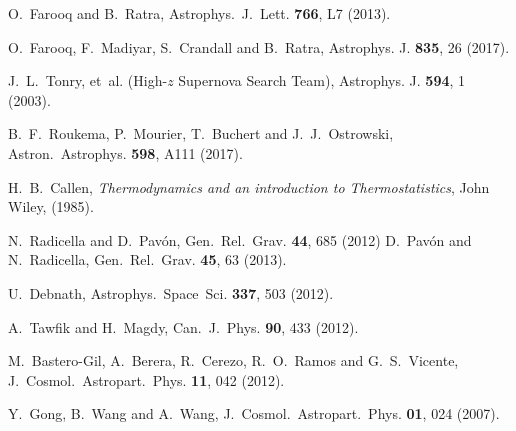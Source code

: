 \documentclass[twocolumn,showpacs,nofootinbib,floats,amsmath,amssymb]{revtex4}
\begin{document}
\begin{thebibliography}{99}
O.~Farooq and B.~Ratra, Astrophys.\ J.\ Lett. {\bf 766}, L7 (2013).

O.~Farooq, F.~Madiyar, S.~Crandall and B.~Ratra, Astrophys. J. {\bf 835}, 26 (2017).

J.~L.~Tonry, et~al. (High-$z$ Supernova Search Team), Astrophys. J. {\bf 594}, 1 (2003). 

B.~F.~Roukema, P.~Mourier, T.~Buchert and J.~J.~Ostrowski, Astron.\ Astrophys. {\bf 598}, A111 (2017).

H.~B.~Callen, {\it Thermodynamics and an introduction to Thermostatistics}, John Wiley, (1985).

N.~Radicella and D.~Pav\'on, Gen.\ Rel.\ Grav. {\bf 44}, 685 (2012)\; D.~Pav\'on and N.~Radicella, Gen.\ Rel.\ Grav. {\bf 45}, 63 (2013).
 
U.~Debnath, Astrophys.\ Space\ Sci. {\bf 337}, 503 (2012).   

A.~Tawfik and H.~Magdy, Can.\ J.\ Phys. {\bf 90}, 433 (2012). 

M.~Bastero-Gil, A.~Berera, R.~Cerezo, R.~O.~Ramos and G.~S.~Vicente, J.\ Cosmol.\ Astropart.\ Phys. {\bf 11}, 042 (2012).

Y.~Gong, B.~Wang and A.~Wang, J.\ Cosmol.\ Astropart.\ Phys. {\bf 01}, 024 (2007).
\end{thebibliography}
\end{document}
